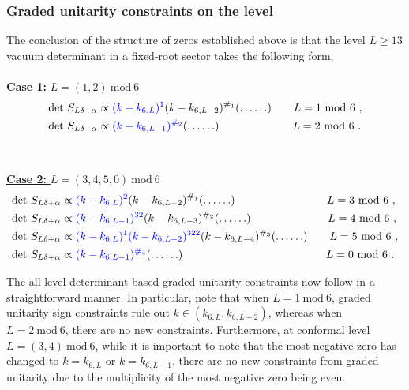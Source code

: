 \subsubsection{Graded unitarity constraints on the level}
The conclusion of the structure of zeros established above is that the level $L \geqslant 13$ vacuum determinant in a fixed-root sector takes the following form,\\
\\
\underline{\textbf{Case 1: } $L = (1,2)~\text{mod}~6$}
\begin{equation} \label{eq:so8vacdet1}
\begin{split}
    &\text{det}~S_{L\delta+\alpha} \propto \textcolor{blue}{(k-k_{6,L})^1}(k-k_{6,L-2})^{\#_1}( \ldots \ldots) \qquad L = 1~\text{mod}~6~, \\
    &\text{det}~S_{L\delta+\alpha} \propto \textcolor{blue}{(k-k_{6,L-1})^{\#_2}}( \ldots \ldots) \qquad \qquad \qquad \ \ L = 2~\text{mod}~6~.
\end{split}
\end{equation}
\\
\\
\underline{\textbf{Case 2: } $L = (3,4,5,0)~\text{mod}~6$}
\begin{equation} \label{eq:so8vacdet2}
\begin{split}
    &\text{det}~S_{L\delta+\alpha} \propto \textcolor{blue}{(k-k_{6,L})^2}(k-k_{6,L-2})^{\#_1}( \ldots \ldots) \qquad \qquad \qquad \qquad \ L = 3~\text{mod}~6~, \\
    &\text{det}~S_{L\delta+\alpha} \propto \textcolor{blue}{(k-k_{6,L-1})^{32}}(k-k_{6,L-3})^{\#_2}( \ldots \ldots) \qquad \qquad \qquad \ \ \ L = 4~\text{mod}~6~, \\
    &\text{det}~S_{L\delta+\alpha} \propto \textcolor{blue}{(k-k_{6,L})^1(k-k_{6,L-2})^{322}}(k-k_{6,L-4})^{\#_3}( \ldots \ldots) \qquad L = 5~\text{mod}~6~, \\
    &\text{det}~S_{L\delta+\alpha} \propto \textcolor{blue}{(k-k_{6,L-1})^{\#_4}}( \ldots \ldots) \qquad \qquad \qquad \qquad \qquad \qquad \ \ \ L = 0~\text{mod}~6~.
\end{split}
\end{equation}

The all-level determinant based graded unitarity constraints now follow in a straightforward manner. In particular, note that when $L = 1~\text{mod}~6$, graded unitarity sign constraints rule out $k \in (k_{6,L},k_{6,L-2})$, whereas when $L = 2~\text{mod}~6$, there are no new constraints. Furthermore, at conformal level $L = (3,4)~\text{mod}~6$, while it is important to note that the most negative zero has changed to $k = k_{6,L}$ or $k = k_{6,L-1}$, there are no new constraints from graded unitarity due to the multiplicity of the most negative zero being even. 

